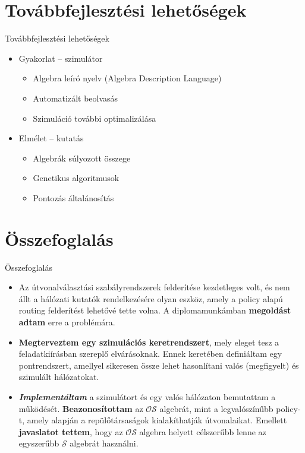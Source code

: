 \section[Továbbfejlesztés]{Továbbfejlesztési lehetőségek}
  \begin{frame}{Továbbfejlesztési lehetőségek}
    \begin{itemize}[<+->]
      \item Gyakorlat -- szimulátor
      \begin{itemize}
        \item Algebra leíró nyelv (Algebra Description Language)
        \item Automatizált beolvasás
        \item Szimuláció további optimalizálása
      \end{itemize}
      \item Elmélet -- kutatás
      \begin{itemize}
        \item Algebrák súlyozott összege
        \item Genetikus algoritmusok
        \item Pontozás általánosítás
      \end{itemize}
    \end{itemize}
  \end{frame}


\section{Összefoglalás}
  \begin{frame}{Összefoglalás}
    \begin{itemize}[<+->]
      \justifying
      \item Az útvonalválasztási szabályrendszerek felderítése kezdetleges volt, és nem állt a hálózati kutatók rendelkezésére olyan eszköz, amely a policy alapú routing felderítést lehetővé tette volna. A diplomamunkámban \textbf{megoldást adtam} erre a problémára.
      \item \textbf{Megterveztem egy szimulációs keretrendszert}, mely eleget tesz a feladatkiírásban szereplő elvárásoknak. Ennek keretében definiáltam egy pontrendszert, amellyel sikeresen össze lehet hasonlítani valós (megfigyelt) és szimulált hálózatokat.
      \item \textbf{\emph{Implementáltam}} a szimulátort és egy valós hálózaton bemutattam a működését. \textbf{Beazonosítottam} az $\mathcal{OS}$ algebrát, mint a legvalószínűbb policy-t, amely alapján a repülőtársaságok kialakíthatják útvonalaikat. Emellett \textbf{javaslatot tettem}, hogy az $\mathcal{OS}$ algebra helyett célszerűbb lenne az egyszerűbb $\mathcal{S}$ algebrát használni.
    \end{itemize}
  \end{frame}
